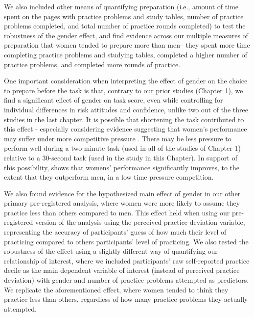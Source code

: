\documentclass[letterpaper, nobind]{templates/ociamthesis}
\begin{document}
We also included other means of quantifying preparation (i.e., amount of time spent on the pages with practice problems and study tables, number of practice problems completed, and total number of practice rounds completed) to test the robustness of the gender effect, and find evidence across our multiple measures of preparation that women tended to prepare more than men-- they spent more time completing practice problems and studying tables, completed a higher number of practice problems, and completed more rounds of practice.

One important consideration when interpreting the effect of gender on the choice to prepare before the task is that, contrary to our prior studies (Chapter 1), we find a significant effect of gender on task score, even while controlling for individual differences in risk attitudes and confidence, unlike two out of the three studies in the last chapter. It is possible that shortening the task contributed to this effect - especially considering evidence suggesting that women's performance may suffer under more competitive pressure \autocite{Gneezy2003,Gneezy2004,Gunther2010,Samak2013,Booth2022,Gneezy2004,Niederle2011,Cotton2013}. There may be less pressure to perform well during a two-minute task (used in all of the studies of Chapter 1) relative to a 30-second task (used in the study in this Chapter). In support of this possibility, \textcite{Shurchkov2012} shows that womens' performance significantly improves, to the extent that they outperform men, in a low time pressure competition.

We also found evidence for the hypothesized main effect of gender in our other primary pre-registered analysis, where women were more likely to assume they practice less than others compared to men. This effect held when using our pre-registered version of the analysis using the perceived practice deviation variable, representing the accuracy of participants' guess of how much their level of practicing compared to others participants' level of practicing. We also tested the robustness of the effect using a slightly different way of quantifying our relationship of interest, where we included participants' raw self-reported practice decile as the main dependent variable of interest (instead of perceived practice deviation) with gender and number of practice problems attempted as predictors. We replicate the aforementioned effect, where women tended to think they practice less than others, regardless of how many practice problems they actually attempted.
\end{document}
